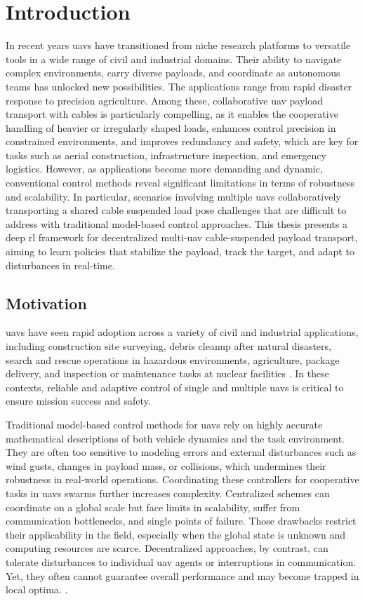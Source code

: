 \chapter{Introduction}
\glsresetall
In recent years \glspl{uav} have transitioned from niche research platforms to versatile tools in a wide range of civil and industrial domains. Their ability to navigate complex environments, carry diverse payloads, and coordinate as autonomous teams has unlocked new possibilities. The applications range from rapid disaster response to precision agriculture. Among these, collaborative \gls{uav} payload transport with cables is particularly compelling, as it enables the cooperative handling of heavier or irregularly shaped loads, enhances control precision in constrained environments, and improves redundancy and safety, which are key for tasks such as aerial construction, infrastructure inspection, and emergency logistics. However, as applications become more demanding and dynamic, conventional control methods reveal significant limitations in terms of robustness and scalability. In particular, scenarios involving multiple \glspl{uav} collaboratively transporting a shared cable suspended load pose challenges that are difficult to address with traditional model-based control approaches.
This thesis presents a deep \gls{rl} framework for decentralized multi-\gls{uav} cable-suspended payload transport, aiming to learn policies that stabilize the payload, track the target, and adapt to disturbances in real-time.

\section{Motivation}
\glspl{uav} have seen rapid adoption across a variety of civil and industrial applications, including construction site surveying, debris cleanup after natural disasters, search and rescue operations in hazardous environments, agriculture, package delivery, and inspection or maintenance tasks at nuclear facilities \autocite{Idrissi2022AROA,Lyu2023UnmannedAVA,Chen2021FromUSA,Abbaraju2018SensingASA}. In these contexts, reliable and adaptive control of single and multiple \glspl{uav} is critical to ensure mission success and safety.

Traditional model-based control methods for \glspl{uav} rely on highly accurate mathematical descriptions of both vehicle dynamics and the task environment. They are often too sensitive to modeling errors and external disturbances such as wind gusts, changes in payload mass, or collisions, which undermines their robustness in real-world operations. Coordinating these controllers for cooperative tasks in \glspl{uav} swarms further increases complexity. Centralized schemes can coordinate on a global scale but face limits in scalability, suffer from communication bottlenecks, and single points of failure. Those drawbacks restrict their applicability in the field, especially when the global state is unknown and computing resources are scarce. Decentralized approaches, by contrast, can tolerate disturbances to individual \gls{uav} agents or interruptions in communication. Yet, they often cannot guarantee overall performance and may become trapped in local optima. \autocite{batra_decentralized_2022, Zhou2020EGOSwarmAF}.


